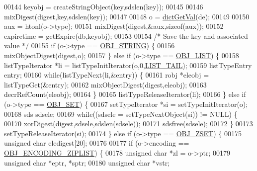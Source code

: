\begin{DoxyCode}
00144             keyobj = createStringObject(key,sdslen(key));
00145 
00146             mixDigest(digest,key,sdslen(key));
00147 
00148             o = \hyperlink{dict_8h_ae8d2cc391873b2bea2b87c4f80f43120}{dictGetVal}(de);
00149 
00150             aux = htonl(o->type);
00151             mixDigest(digest,&aux,\textcolor{keyword}{sizeof}(aux));
00152             expiretime = getExpire(db,keyobj);
00153 
00154             \textcolor{comment}{/* Save the key and associated value */}
00155             \textcolor{keywordflow}{if} (o->type == \hyperlink{server_8h_a65236ea160f69cdef33ec942092af88f}{OBJ\_STRING}) \{
00156                 mixObjectDigest(digest,o);
00157             \} \textcolor{keywordflow}{else} \textcolor{keywordflow}{if} (o->type == \hyperlink{server_8h_a4a5f22a280949c97a0cb0d4213275126}{OBJ\_LIST}) \{
00158                 listTypeIterator *li = listTypeInitIterator(o,0,\hyperlink{server_8h_a745de98bef5b645df56479181803235b}{LIST\_TAIL});
00159                 listTypeEntry entry;
00160                 \textcolor{keywordflow}{while}(listTypeNext(li,&entry)) \{
00161                     robj *eleobj = listTypeGet(&entry);
00162                     mixObjectDigest(digest,eleobj);
00163                     decrRefCount(eleobj);
00164                 \}
00165                 listTypeReleaseIterator(li);
00166             \} \textcolor{keywordflow}{else} \textcolor{keywordflow}{if} (o->type == \hyperlink{server_8h_a8d179375a4aac33d3fa7aa80c8ccc75f}{OBJ\_SET}) \{
00167                 setTypeIterator *si = setTypeInitIterator(o);
00168                 sds sdsele;
00169                 \textcolor{keywordflow}{while}((sdsele = setTypeNextObject(si)) != NULL) \{
00170                     xorDigest(digest,sdsele,sdslen(sdsele));
00171                     sdsfree(sdsele);
00172                 \}
00173                 setTypeReleaseIterator(si);
00174             \} \textcolor{keywordflow}{else} \textcolor{keywordflow}{if} (o->type == \hyperlink{server_8h_a8c356422ddbc03bd77694880a30a1953}{OBJ\_ZSET}) \{
00175                 \textcolor{keywordtype}{unsigned} \textcolor{keywordtype}{char} eledigest[20];
00176 
00177                 \textcolor{keywordflow}{if} (o->encoding == \hyperlink{server_8h_aabf064ede983103f1fd0df2086e84eee}{OBJ\_ENCODING\_ZIPLIST}) \{
00178                     \textcolor{keywordtype}{unsigned} \textcolor{keywordtype}{char} *zl = o->ptr;
00179                     \textcolor{keywordtype}{unsigned} \textcolor{keywordtype}{char} *eptr, *sptr;
00180                     \textcolor{keywordtype}{unsigned} \textcolor{keywordtype}{char} *vstr;

\end{DoxyCode}
